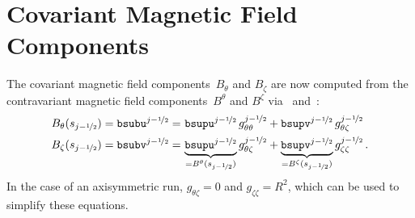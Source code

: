 \section{Covariant Magnetic Field Components} \label{sec:bcov}
The covariant magnetic field components~$B_\theta$ and $B_\zeta$ are now computed
from the contravariant magnetic field components~$B^\theta$ and $B^\zeta$
via~ and~:
\begin{align}
  B_\theta(s_{j-\nicefrac{1}{2}}) = \texttt{bsubu}^{j-\nicefrac{1}{2}} =&\,          \,   \texttt{bsupu}^{j-\nicefrac{1}{2}}                            \, g_{\theta \theta}^{j-\nicefrac{1}{2}} +             \texttt{bsupv}^{j-\nicefrac{1}{2}}                           \, g_{\theta \zeta}^{j-\nicefrac{1}{2}} \\
  B_\zeta (s_{j-\nicefrac{1}{2}}) = \texttt{bsubv}^{j-\nicefrac{1}{2}} =&\,   \underbrace{\texttt{bsupu}^{j-\nicefrac{1}{2}}}_{= B^\theta(s_{j-\nicefrac{1}{2}})}    g_{\theta \zeta }^{j-\nicefrac{1}{2}} + \underbrace{\texttt{bsupv}^{j-\nicefrac{1}{2}}}_{= B^\zeta(s_{j-\nicefrac{1}{2}})}    g_{\zeta  \zeta}^{j-\nicefrac{1}{2}} \, .
\end{align}
In the case of an axisymmetric run, $g_{\theta \zeta } = 0$ and $g_{\zeta  \zeta} = R^2$,
which can be used to simplify these equations.

\FloatBarrier
